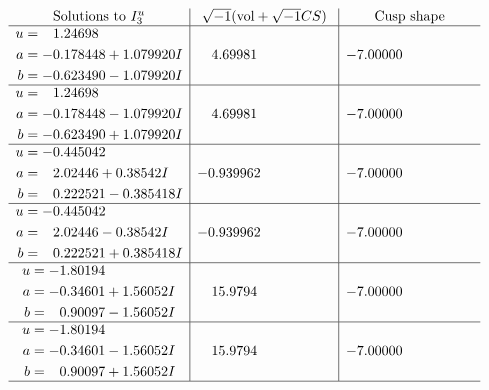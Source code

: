 \documentclass[1p]{elsarticle_modified}
\theoremstyle{definition}
\newcommand{\I}{\sqrt{-1}}
\begin{document}
$$\begin{array}{c|c|c}  
\text{Solutions to }I^u_{3}& \I (\text{vol} + \sqrt{-1}CS) & \text{Cusp shape}\\
 \hline 
\begin{aligned}
u &= \phantom{-}1.24698\phantom{ +0.000000I} \\
a &= -0.178448 + 1.079920 I \\
b &= -0.623490 - 1.079920 I\end{aligned}
 & \phantom{-}4.69981\phantom{ +0.000000I} & -7.00000\phantom{ +0.000000I} \\ \hline\begin{aligned}
u &= \phantom{-}1.24698\phantom{ +0.000000I} \\
a &= -0.178448 - 1.079920 I \\
b &= -0.623490 + 1.079920 I\end{aligned}
 & \phantom{-}4.69981\phantom{ +0.000000I} & -7.00000\phantom{ +0.000000I} \\ \hline\begin{aligned}
u &= -0.445042\phantom{ +0.000000I} \\
a &= \phantom{-}2.02446 + 0.38542 I \\
b &= \phantom{-}0.222521 - 0.385418 I\end{aligned}
 & -0.939962\phantom{ +0.000000I} & -7.00000\phantom{ +0.000000I} \\ \hline\begin{aligned}
u &= -0.445042\phantom{ +0.000000I} \\
a &= \phantom{-}2.02446 - 0.38542 I \\
b &= \phantom{-}0.222521 + 0.385418 I\end{aligned}
 & -0.939962\phantom{ +0.000000I} & -7.00000\phantom{ +0.000000I} \\ \hline\begin{aligned}
u &= -1.80194\phantom{ +0.000000I} \\
a &= -0.34601 + 1.56052 I \\
b &= \phantom{-}0.90097 - 1.56052 I\end{aligned}
 & \phantom{-}15.9794\phantom{ +0.000000I} & -7.00000\phantom{ +0.000000I} \\ \hline\begin{aligned}
u &= -1.80194\phantom{ +0.000000I} \\
a &= -0.34601 - 1.56052 I \\
b &= \phantom{-}0.90097 + 1.56052 I\end{aligned}
 & \phantom{-}15.9794\phantom{ +0.000000I} & -7.00000\phantom{ +0.000000I}\\
 \hline 
 \end{array}$$\newpage\newpage\renewcommand{\arraystretch}{1}
\end{document}
